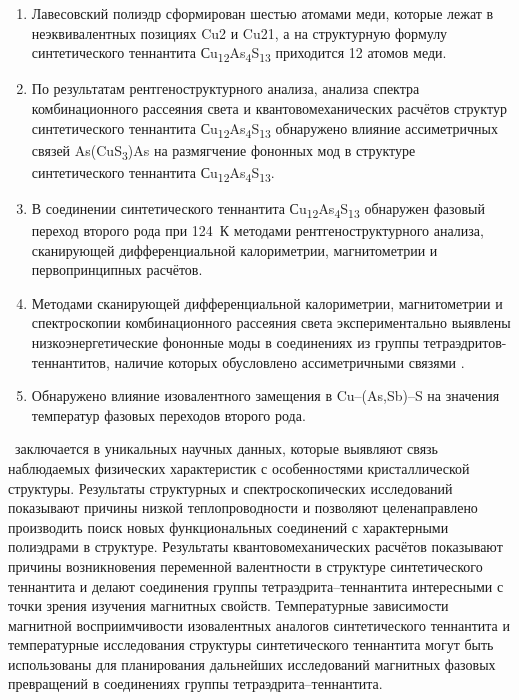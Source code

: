 \novelty
\begin{enumerate}
\item Лавесовский полиэдр сформирован шестью атомами меди, которые лежат в неэквивалентных позициях Cu2 и Cu21, а на структурную формулу синтетического теннантита Сu\textsubscript{12}As\textsubscript{4}S\textsubscript{13} приходится 12 атомов меди.
\item По результатам рентгеноструктурного анализа, анализа спектра комбинационного рассеяния света и квантовомеханических расчётов структур синтетического теннантита Сu\textsubscript{12}As\textsubscript{4}S\textsubscript{13} обнаружено влияние ассиметричных связей As(CuS\textsubscript{3})As на размягчение фононных мод в структуре синтетического теннантита Сu\textsubscript{12}As\textsubscript{4}S\textsubscript{13}.
\item В соединении  синтетического теннантита Сu\textsubscript{12}As\textsubscript{4}S\textsubscript{13} обнаружен фазовый переход второго рода
 при 124~К методами рентгеноструктурного анализа, сканирующей дифференциальной калориметрии, магнитометрии и первопринципных расчётов.
\item Методами сканирующей дифференциальной калориметрии, магнитометрии и спектроскопии комбинационного рассеяния света экспериментально выявлены низкоэнергетические фононные моды  в соединениях из группы тетраэдритов-теннантитов, наличие которых обусловлено  ассиметричными связями .
\item Обнаружено влияние изовалентного замещения в Cu--(As,Sb)--S на значения температур фазовых переходов второго рода.
\end{enumerate}

\influence\ заключается в уникальных научных данных, которые выявляют связь наблюдаемых физических характеристик с особенностями кристаллической структуры.
Результаты структурных и спектроскопических исследований показывают причины низкой теплопроводности и позволяют целенаправлено производить поиск новых функциональных соединений с характерными полиэдрами в структуре. Результаты квантовомеханических расчётов показывают причины возникновения переменной валентности в структуре синтетического теннантита и делают соединения группы тетраэдрита--теннантита интересными с точки зрения изучения магнитных свойств.
Температурные зависимости магнитной восприимчивости изовалентных аналогов синтетического теннантита и температурные исследования структуры синтетического теннантита могут быть использованы для планирования дальнейших исследований магнитных фазовых превращений в соединениях группы тетраэдрита--теннантита.

